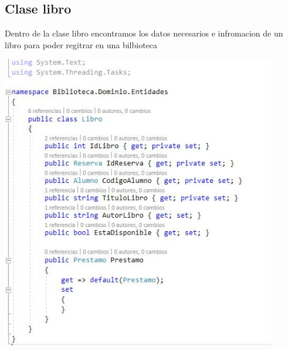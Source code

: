  \subsection{Clase libro}
 Dentro de la clase libro encontramos los datos necesarios e infromacion de un libro para poder regitrar en una bilbioteca
 	\begin{center}
	\includegraphics[width=12cm]{./Imagenes/img11libro} 
	\end{center}
	
 \newpage
